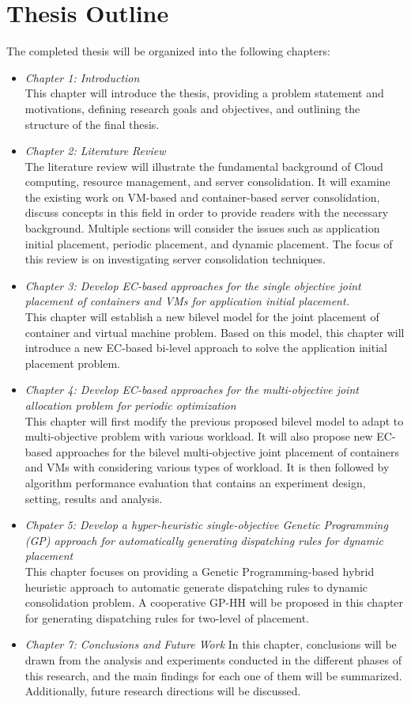 \section{Thesis Outline}
The completed thesis will be organized into the following chapters:
\begin{itemize}
	\item \textit{Chapter 1: Introduction} \\
	This chapter will introduce the thesis, providing a problem statement and motivations, defining research goals and objectives, and outlining the structure of the final thesis.
	\item \textit{Chapter 2: Literature Review} \\
	The literature review will illustrate the fundamental background of Cloud computing, resource management, and server consolidation. It will examine the existing work on VM-based and container-based server consolidation, discuss concepts in this field in order to provide readers with the necessary background. Multiple sections will consider the issues such as application initial placement, periodic placement, and dynamic placement. The focus of this review is on investigating server consolidation techniques.
	\item \textit{Chapter 3: Develop EC-based approaches for the single objective joint placement of containers and VMs for application initial placement.} \\
	This chapter will establish a new bilevel model for the joint placement of container and virtual machine problem. Based on this model, this chapter will introduce a new EC-based bi-level approach to solve the application initial placement problem. 
	\item \textit{Chapter 4: Develop EC-based approaches for the multi-objective joint allocation problem for periodic optimization} \\
	This chapter will first modify the previous proposed bilevel model to adapt to multi-objective problem with various workload.  It will also propose new EC-based approaches for the bilevel multi-objective joint placement of containers and VMs with considering various types of workload. It is then followed by algorithm performance evaluation that contains an experiment design, setting, results and analysis.
	\item \textit{Chpater 5: Develop a hyper-heuristic single-objective Genetic Programming (GP) approach for automatically generating dispatching rules for dynamic placement} \\
	This chapter focuses on providing a Genetic Programming-based hybrid heuristic approach to automatic generate dispatching rules to dynamic consolidation problem. A cooperative GP-HH will be proposed in this chapter for generating dispatching rules for two-level of placement.
	\item \textit{Chapter 7: Conclusions and Future Work}
	In this chapter, conclusions will be drawn from the analysis and experiments conducted in the different phases of this research, and the main findings for each one of them will be summarized. Additionally, future research directions will be discussed.

\end{itemize}


